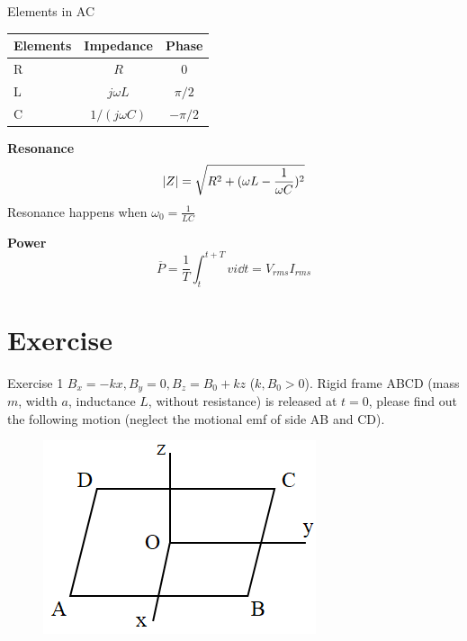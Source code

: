 \documentclass[9pt]{beamer}
\begin{document}
\begin{frame}{Elements in AC}
    \begin{table}[htbp]
        \centering
        \begin{tabular}{l c c}
            \toprule
            Elements & Impedance & Phase \\ 
            \midrule
            R & $R$ & 0 \\  
            L & $j\omega L $ & $\pi/2$ \\ 
            C & $1/(j \omega C)$ & $-\pi/2$ \\ 
            \bottomrule
        \end{tabular}
    \end{table}
    
    \begin{beamerboxesrounded}[shadow=true]{\bf Resonance}
        \begin{equation}
            \abs{Z} = \sqrt{R^2+(\omega L - \frac{1}{\omega C})^2 }
        \end{equation}
        Resonance happens when $\omega_0 = \frac{1}{LC}$        
    \end{beamerboxesrounded}

    \begin{beamerboxesrounded}[shadow=true]{\bf Power}
        \begin{equation}
            \overline{P} = \frac{1}{T} \int_{t}^{t+T}vi \dd t = V_{rms} I_{rms} 
        \end{equation}
    \end{beamerboxesrounded}
\end{frame}


\section{Exercise}

\begin{frame}{Exercise 1}
$B_{x}=-k x, B_{y}=0, B_{z}=B_{0}+k z$ ($k,B_0 > 0$). Rigid frame ABCD (mass $m$, width $a$, inductance $L$, without resistance) is released at $t=0$, please find out the following motion (neglect the motional emf of side AB and CD). 
\begin{figure}[htbp]
    \centering
    \includegraphics[scale=0.8]{images/ex1.png}
\end{figure}
\end{frame}
\end{document}
